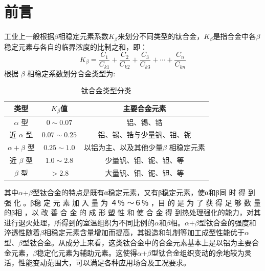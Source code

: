\documentclass[
class = book,
zihao = -4,
font = noto,
paper = a4paper,
openany
]{easybook}
\newcommand{\ti}{Ti6Al4V}
\begin{document}
	\maketitle
	\frontmatter*[roman]

	\begin{abstract}
		\ti 合金又名TC4合金，拥有较好的塑韧性、耐热性、成形性、耐蚀性等，在机械、军事、航空航天等领域获得了极为广泛的应用。但TC4合金仍存在硬度较低、摩擦磨损系数高、耐磨性能差、较低的塑韧性和力学性能上的各向异性等缺点，制约了其进一步的应用。
		本文阐述了TC4钛合金的热处理工艺研究现状，并分析了不同热处理制度对Ti6Al4V合金强度的影响，并解析了组织转变的机理，为工程应用提供了有价值的参考，最后提出了TC4钛合金热处理工艺的研究方向。\\

	\end{abstract}

	\tableofcontents
	\mainmatter*
	\pagestyle{Xju}
\chapter{前言}
工业上一般根据$\beta $相稳定元素系数$K_{\beta}$来划分不同类型的钛合金，$K_{\beta}$是指合金中各$\beta $稳定元素与各自的临界浓度的比制之和，即：
$$
K_{\beta}=\frac{ C_{1} }{C_{k1}}+\frac{ C_{2} }{C_{k2}}+\frac{ C_{3} }{C_{k3}}+\cdots+\frac{ C_{n} }{C_{kn}}
$$
根据 $\beta$ 相稳定系数划分合金类型为:

\begin{table}[htbp]
	\centering
	\label{sec:sort}
	\caption{钛合金类型分类}
		\begin{tabular}{ccc}
			\toprule
			类型&$K_\beta$值&主要合金元素 \\
			\midrule
			 $\alpha$ 型& $0 \sim 0.07$&铝、锡、锆\\
			 近 $\alpha$ 型&$0.07 \sim 0.25$&铝、锡、锆与少量钒、钼、铌\\
			 $\alpha+\beta$ 型&$0.25 \sim 1.0$&以铝为主、以及其他少量$\beta$ 相稳定元素\\
			 近 $\beta$ 型&$1.0 \sim 2.8$&少量钒、钼、铌、钽、等\\
			$\beta$ 型&$ > 2.8 $&大量钒、钼、铌、钽、等\\
			\bottomrule
		\end{tabular}
\end{table}
其中$\alpha $+$\beta $型钛合金的特点是既有α稳定元素，又有β稳定元素，使α和β同 时 得 到 强 化 。β稳 定 元 素 加 入 量 为 ４％ ～６％ ，目 的 是 为 了 获 得 足 够 数 量 的β相 ，以 改 善 合 金 的 成 形 塑 性 和 使 合 金 得 到热处理强化的能力，对其进行退火处理，所得到的室温组织为不同比例的$\alpha $和$\beta $相。$\alpha $+$\beta $型钛合金的强度和淬透性随着$\beta $相稳定元素含量增加而提高，其锻造和轧制等加工成型性能优于$\alpha $型、$\beta $型钛合金。从成分上来看，这类钛合金中的合金元素基本上是以铝为主要合金元素，$\beta $稳定化元素为辅助元素。这使得$\alpha $+$\beta $型钛合金组织变动的余地较为灵活，性能变动范围大，可以满足各种应用场合及工况要求\cite{TiandAl}。
\end{document}
